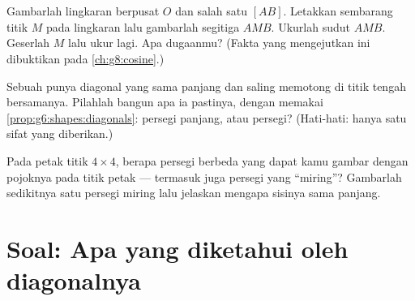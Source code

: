 \begin{exercise}[$\star\star$]\label{exo:g6:shapes:10}
Gambarlah lingkaran berpusat $O$ dan salah satu  $[AB]$.
Letakkan sembarang titik $M$ pada lingkaran lalu gambarlah segitiga
$AMB$. Ukurlah sudut $\widehat{AMB}$. Geserlah $M$ lalu ukur lagi. Apa
dugaanmu? (Fakta yang mengejutkan ini dibuktikan pada \cref{ch:g8:cosine}.)
\end{exercise}

\begin{exercise}[$\star\star$]\label{exo:g6:shapes:11}
Sebuah  punya diagonal yang sama panjang dan saling
memotong di titik tengah bersamanya. Pilahlah bangun apa ia pastinya,
dengan memakai \cref{prop:g6:shapes:diagonals}: persegi panjang,  atau persegi? (Hati-hati: hanya satu sifat yang diberikan.)
\end{exercise}

\begin{exercise}[$\star\star\star$]\label{exo:g6:shapes:12}
Pada petak titik $4 \times 4$, berapa persegi berbeda yang dapat kamu
gambar dengan pojoknya pada titik petak --- termasuk juga persegi yang
``miring''? Gambarlah sedikitnya satu persegi miring lalu jelaskan
mengapa sisinya sama panjang.
\end{exercise}

\section{Soal: Apa yang diketahui oleh diagonalnya}

